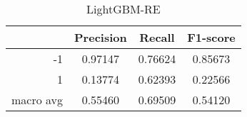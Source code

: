 \begin{table}[!h]
    \centering
    \renewcommand{\arraystretch}{1.5}
    \begin{tabular}{|r|c|c|c|}
        \hline
                  & Precision & Recall & F1-score \\ \hline
        -1        &     0.97147     &     0.76624   &    0.85673      \\ \hline
        1         &     0.13774      &     0.62393   &   0.22566       \\ \hline
        macro avg &      0.55460     &     0.69509   &    0.54120      \\ \hline
    \end{tabular}
    \caption{LightGBM-RE}
\end{table}
